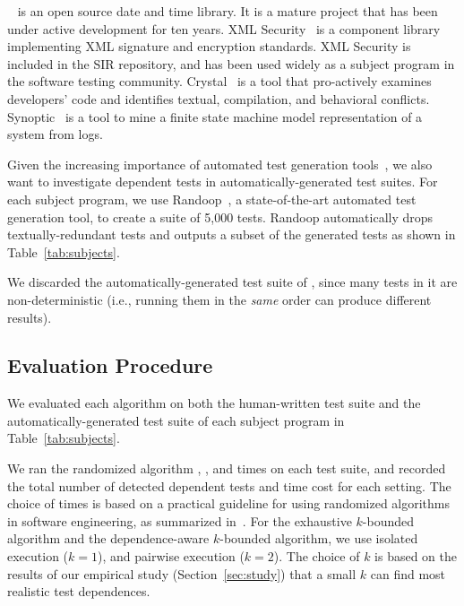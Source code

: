 \jt~\cite{jodatime} is an open source
date and time library. It is a mature project that
has been under active development
for ten years. XML Security~\cite{xmlsecurity}
is a component library implementing XML signature and encryption
standards. XML Security is included in
the SIR repository, and has been used widely
as a subject program in the software testing community.
Crystal~\cite{crystal} is a tool that
pro-actively examines developers' code and
identifies textual, compilation, and behavioral conflicts.
Synoptic~\cite{synoptic} is a tool to mine a finite state
machine model representation of a system from logs.

Given the increasing importance of automated test generation
tools~\cite{PachecoLET2007, ZhangSBE2011, Csallner:2004, fraseretal:ISSTA:2011},
we also want to investigate dependent tests in automatically-generated
test suites. For each subject program, we use
Randoop~\cite{PachecoLET2007}, a state-of-the-art automated
test generation tool, to create a suite of 5,000 tests.
Randoop automatically drops textually-redundant tests 
and outputs a subset of the generated tests as
shown in Table~\ref{tab:subjects}.

We discarded the automatically-generated test suite of
\jt, since many tests in it are non-deterministic (i.e., 
running them in the \textit{same} order
can produce different results).


\subsection{Evaluation Procedure}

We evaluated each algorithm 
on both the human-written test suite 
and the automatically-generated test suite
of each subject program in Table~\ref{tab:subjects}.


We ran the randomized algorithm \smalltrialnum, \mediumtrialnum,
and \trialnum times on each test suite, and recorded
the total number of detected dependent tests and time cost
for each setting. The choice of \trialnum times is based
on a practical guideline for using randomized algorithms
in software engineering, as summarized in~\cite{Arcuri:2011}.
%
For the exhaustive $k$-bounded algorithm
and the dependence-aware $k$-bounded algorithm,
we use isolated execution ($k = 1$), and
pairwise execution ($k = 2$). The choice of $k$ is
based on the results of our empirical
study (Section~\ref{sec:study}) that a small $k$
can find most realistic test dependences.

